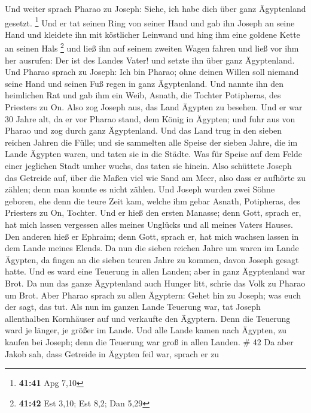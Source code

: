 Und weiter sprach Pharao zu Joseph: Siehe, ich habe dich über ganz
Ägyptenland gesetzt. \footnote{\textbf{41:41} Apg 7,10} 
Und er tat seinen Ring von seiner Hand und gab ihn Joseph an seine Hand
und kleidete ihn mit köstlicher Leinwand und hing ihm eine goldene Kette
an seinen Hals \footnote{\textbf{41:42} Est 3,10; Est 8,2; Dan 5,29}
 und ließ ihn auf seinem zweiten Wagen fahren und ließ vor
ihm her ausrufen: Der ist des Landes Vater! und setzte ihn über ganz
Ägyptenland.  Und Pharao sprach zu Joseph: Ich bin Pharao;
ohne deinen Willen soll niemand seine Hand und seinen Fuß regen in ganz
Ägyptenland.  Und nannte ihn den heimlichen Rat und gab ihm
ein Weib, Asnath, die Tochter Potipheras, des Priesters zu On. Also zog
Joseph aus, das Land Ägypten zu besehen.  Und er war 30
Jahre alt, da er vor Pharao stand, dem König in Ägypten; und fuhr aus
von Pharao und zog durch ganz Ägyptenland.  Und das Land
trug in den sieben reichen Jahren die Fülle;  und sie
sammelten alle Speise der sieben Jahre, die im Lande Ägypten waren, und
taten sie in die Städte. Was für Speise auf dem Felde einer jeglichen
Stadt umher wuchs, das taten sie hinein.  Also schüttete
Joseph das Getreide auf, über die Maßen viel wie Sand am Meer, also dass
er aufhörte zu zählen; denn man konnte es nicht zählen. 
Und Joseph wurden zwei Söhne geboren, ehe denn die teure Zeit kam,
welche ihm gebar Asnath, Potipheras, des Priesters zu On, Tochter.
 Und er hieß den ersten Manasse; denn Gott, sprach er, hat
mich lassen vergessen alles meines Unglücks und all meines Vaters
Hauses.  Den anderen hieß er Ephraim; denn Gott, sprach er,
hat mich wachsen lassen in dem Lande meines Elends.  Da nun
die sieben reichen Jahre um waren im Lande Ägypten,  da
fingen an die sieben teuren Jahre zu kommen, davon Joseph gesagt hatte.
Und es ward eine Teuerung in allen Landen; aber in ganz Ägyptenland war
Brot.  Da nun das ganze Ägyptenland auch Hunger litt,
schrie das Volk zu Pharao um Brot. Aber Pharao sprach zu allen Ägyptern:
Gehet hin zu Joseph; was euch der sagt, das tut.  Als nun
im ganzen Lande Teuerung war, tat Joseph allenthalben Kornhäuser auf und
verkaufte den Ägyptern. Denn die Teuerung ward je länger, je größer im
Lande.  Und alle Lande kamen nach Ägypten, zu kaufen bei
Joseph; denn die Teuerung war groß in allen Landen. \# 42 
Da aber Jakob sah, dass Getreide in Ägypten feil war, sprach er zu
